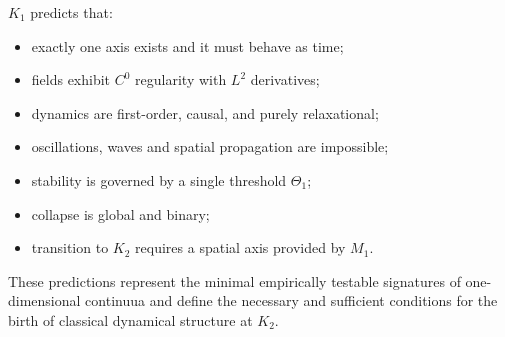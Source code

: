 $K_1$ predicts that:

\begin{itemize}
    \item exactly one axis exists and it must behave as time;
    \item fields exhibit $C^0$ regularity with $L^2$ derivatives;
    \item dynamics are first-order, causal, and purely relaxational;
    \item oscillations, waves and spatial propagation are impossible;
    \item stability is governed by a single threshold $\Theta_1$;
    \item collapse is global and binary;
    \item transition to $K_2$ requires a spatial axis provided by $M_1$.
\end{itemize}

These predictions represent the minimal empirically testable signatures of
one-dimensional continuua and define the necessary and sufficient conditions
for the birth of classical dynamical structure at $K_2$.
